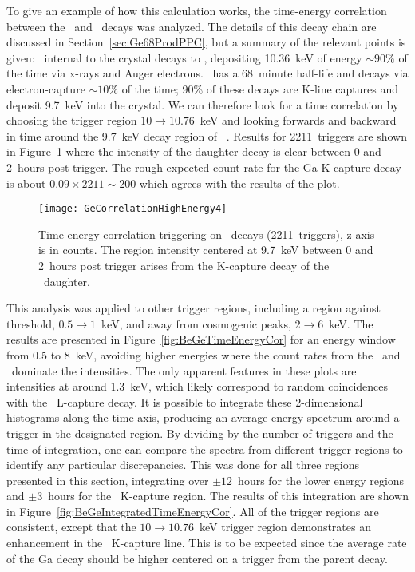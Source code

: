 	To give an example of how this calculation works, the time-energy correlation between the \gersixeight~and \galsixeight~decays was analyzed.  The details of this decay chain are discussed in Section~\ref{sec:Ge68ProdPPC}, but a summary of the relevant points is given:  \gersixeight~internal to the crystal decays to \galsixeight, depositing 10.36~keV of energy $\sim90\%$ of the time via x-rays and Auger electrons.  \galsixeight~has a 68~minute half-life and decays via electron-capture $\sim10$\% of the time; 90\% of these decays are K-line captures and deposit 9.7~keV into the crystal.  We can therefore look for a time correlation by choosing the trigger region $10\to10.76$~keV and looking forwards and backward in time around the 9.7~keV decay region of \galsixeight~\cite{Schonfeld1994955}.  Results for 2211~triggers are shown in Figure~\ref{fig:BeGeGeCorrelation} where the intensity of the daughter decay is clear between 0 and 2~hours post trigger.  The rough expected count rate for the Ga K-capture decay is about $0.09\times2211 \sim 200$ which agrees with the results of the plot.  
	

			\begin{figure}
				\centering
				\texttt{[image: GeCorrelationHighEnergy4]}
				\caption[Time-energy correlation triggering on \gersixeight~decays.]
				{Time-energy correlation triggering on \gersixeight~decays (2211~triggers), z-axis is in counts.  The region intensity centered at 9.7~keV between 0 and 2~hours post trigger arises from the K-capture decay of the 
				\galsixeight~daughter.}
				\label{fig:BeGeGeCorrelation}
			\end{figure}	

	This analysis was applied to other trigger regions, including a region against threshold, $0.5\to1$~keV, and away from cosmogenic peaks, $2\to6$~keV.  The results are presented in Figure~\ref{fig:BeGeTimeEnergyCor} for an energy window from 0.5 to 8~keV, avoiding higher energies where the count rates from the \znsixfive~and \gersixeight~dominate the intensities.  The only apparent features in these plots are intensities at around 1.3~keV, which likely correspond to random coincidences with the \gersixeight~L-capture decay.  It is possible to integrate these 2-dimensional histograms along the time axis, producing an average energy spectrum around a trigger in the designated region.  By dividing by the number of triggers and the time of integration, one can compare the spectra from different trigger regions to identify any particular discrepancies.  This was done for all three regions presented in this section, integrating over $\pm12$~hours for the lower energy regions and $\pm3$~hours for the \gersixeight~K-capture region.  The results of this integration are shown in Figure~\ref{fig:BeGeIntegratedTimeEnergyCor}.  All of the trigger regions are consistent, except that the $10\to10.76$~keV trigger region demonstrates an enhancement in the \galsixeight~K-capture line.  This is to be expected since the average rate of the Ga decay should be higher centered on a trigger from the parent decay.

